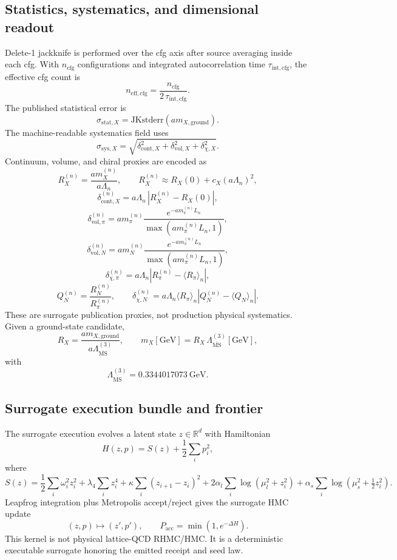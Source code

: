 \documentclass[11pt]{article}
\begin{document}
\subsection{Statistics, systematics, and dimensional readout}

Delete-1 jackknife is performed over the cfg axis after source averaging inside each cfg. With
\(n_{\mathrm{cfg}}\) configurations and integrated autocorrelation time
\(\tau_{\mathrm{int},\mathrm{cfg}}\), the effective cfg count is
\[
n_{\mathrm{eff},\mathrm{cfg}}
=
\frac{n_{\mathrm{cfg}}}{2\,\tau_{\mathrm{int},\mathrm{cfg}}}.
\]
The published statistical error is
\[
\sigma_{\mathrm{stat},X}
=
\mathrm{JKstderr}(a m_{X,\mathrm{ground}}).
\]
The machine-readable systematics field uses
\[
\sigma_{\mathrm{sys},X}
=
\sqrt{
\delta_{\mathrm{cont},X}^2
+
\delta_{\mathrm{vol},X}^2
+
\delta_{\chi,X}^2
}.
\]
Continuum, volume, and chiral proxies are encoded as
\[
R_X^{(n)} = \frac{a m_X^{(n)}}{a\Lambda_n},
\qquad
R_X^{(n)} \approx R_X(0) + c_X (a\Lambda_n)^2,
\]
\[
\delta_{\mathrm{cont},X}^{(n)}
=
a\Lambda_n\,\left|R_X^{(n)} - R_X(0)\right|,
\]
\[
\delta_{\mathrm{vol},\pi}^{(n)}
=
a m_\pi^{(n)}
\frac{e^{-a m_\pi^{(n)}L_n}}{\max(a m_\pi^{(n)}L_n,1)},
\]
\[
\delta_{\mathrm{vol},N}^{(n)}
=
a m_N^{(n)}
\frac{e^{-a m_\pi^{(n)}L_n}}{\max(a m_\pi^{(n)}L_n,1)},
\]
\[
\delta_{\chi,\pi}^{(n)}
=
a\Lambda_n \left|R_\pi^{(n)} - \langle R_\pi\rangle_n\right|,
\]
\[
Q_N^{(n)} = \frac{R_N^{(n)}}{R_\pi^{(n)}},
\qquad
\delta_{\chi,N}^{(n)}
=
a\Lambda_n \langle R_\pi\rangle_n
\left|Q_N^{(n)} - \langle Q_N\rangle_n\right|.
\]
These are surrogate publication proxies, not production physical systematics. Given a
ground-state candidate,
\[
R_X = \frac{a m_{X,\mathrm{ground}}}{a\Lambda_{\overline{\mathrm{MS}}}^{(3)}},
\qquad
m_X[\mathrm{GeV}] = R_X\,\Lambda_{\overline{\mathrm{MS}}}^{(3)}[\mathrm{GeV}],
\]
with
\[
\Lambda_{\overline{\mathrm{MS}}}^{(3)} = 0.3344017073\ \mathrm{GeV}.
\]

\subsection{Surrogate execution bundle and frontier}

The surrogate execution evolves a latent state \(z\in\mathbb{R}^d\) with Hamiltonian
\[
H(z,p) = S(z) + \frac12 \sum_i p_i^2,
\]
where
\[
S(z)
=
\frac12 \sum_i \omega_i^2 z_i^2
+
\lambda_4 \sum_i z_i^4
+
\kappa \sum_i (z_{i+1}-z_i)^2
+
2\alpha_l \sum_i \log(\mu_l^2 + z_i^2)
+
\alpha_s \sum_i \log(\mu_s^2 + \tfrac12 z_i^2).
\]
Leapfrog integration plus Metropolis accept/reject gives the surrogate HMC update
\[
(z,p) \mapsto (z',p'),
\qquad
P_{\mathrm{acc}} = \min(1,e^{-\Delta H}).
\]
This kernel is not physical lattice-QCD RHMC/HMC. It is a deterministic executable surrogate
honoring the emitted receipt and seed law.
\end{document}
